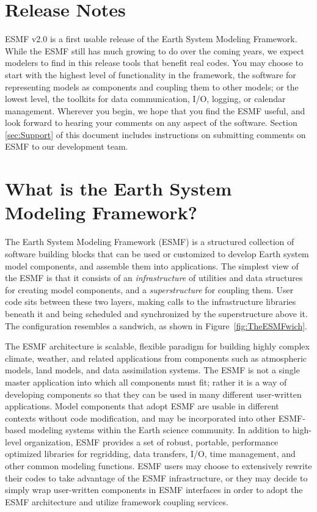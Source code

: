 
\section{Release Notes}

ESMF v2.0 is a first usable release of the Earth System 
Modeling Framework.  While the ESMF still has much growing to do
over the coming years, we expect modelers to find in this release 
tools that benefit real codes.  You may choose to start with the
highest level of functionality in the framework, the software
for representing models as components and coupling them to other
models; or the lowest level, the toolkits for data communication,
I/O, logging, or calendar management.  Wherever you begin, we hope
that you find the ESMF useful, and look forward to hearing your
comments on any aspect of the software.  
Section \ref{sec:Support} 
of this document includes instructions on submitting comments on 
ESMF to our development team.

\section{What is the Earth System Modeling Framework?}

The Earth System Modeling Framework (ESMF) is a structured collection of 
software building blocks that can be used or customized to develop 
Earth system model components, and assemble them into applications.  
The simplest view of the ESMF is that it consists of an {\it infrastructure} 
of utilities and data structures for creating 
model components, and a {\it superstructure} for coupling them.  
User code sits between these two layers, making calls to the infrastructure
libraries beneath it and being scheduled and synchronized by the 
superstructure above it.  The configuration resembles a sandwich, as
shown in Figure~\ref{fig:TheESMFwich}.

The ESMF architecture is scalable, flexible paradigm for building highly 
complex climate, weather, and related applications from components such
as atmospheric models, land models, and data assimilation systems.  The 
ESMF is not a single master application into which all components must fit; 
rather it is a way of developing components so that they can be used 
in many different user-written applications.  Model components that adopt 
ESMF are usable in different contexts without code modification, and may be
incorporated into other ESMF-based modeling systems within the Earth 
science community.  In addition to high-level organization, ESMF provides 
a set of robust, portable, performance optimized libraries for regridding, 
data transfers, I/O, time management, and other common modeling functions.  
ESMF users may choose to extensively rewrite their codes to take advantage 
of the ESMF infrastructure, or they may decide to simply wrap user-written 
components in ESMF interfaces in order to adopt the ESMF architecture and 
utilize framework coupling services.

